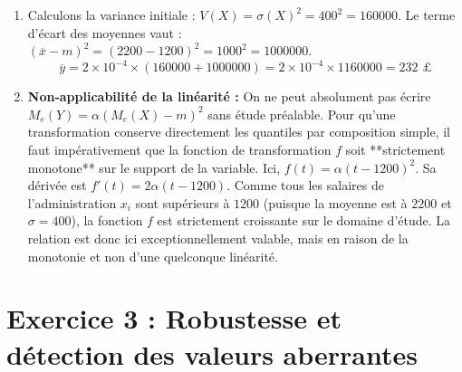 \documentclass[11pt,a4paper]{article}
\begin{document}
\begin{enumerate}
\begin{enumerate}
        \item Calculons la variance initiale : $V(X) = \sigma(X)^2 = 400^2 = 160000$.
        Le terme d'écart des moyennes vaut : $(\overline{x} - m)^2 = (2200 - 1200)^2 = 1000^2 = 1000000$.
        \[ \overline{y} = 2 \times 10^{-4} \times (160000 + 1000000) = 2 \times 10^{-4} \times 1160000 = 232 \text{ £} \]
        
        \item \textbf{Non-applicabilité de la linéarité :} On ne peut absolument pas écrire $M_e(Y) = \alpha(M_e(X)-m)^2$ sans étude préalable. Pour qu'une transformation conserve directement les quantiles par composition simple, il faut impérativement que la fonction de transformation $f$ soit **strictement monotone** sur le support de la variable. 
        Ici, $f(t) = \alpha(t-1200)^2$. Sa dérivée est $f'(t) = 2\alpha(t-1200)$. Comme tous les salaires de l'administration $x_i$ sont supérieurs à $1200$ (puisque la moyenne est à $2200$ et $\sigma=400$), la fonction $f$ est strictement croissante sur le domaine d'étude. La relation est donc ici exceptionnellement valable, mais en raison de la monotonie et non d'une quelconque linéarité.
    \end{enumerate}
\end{enumerate}

\section*{Exercice 3 : Robustesse et détection des valeurs aberrantes}
\end{document}
